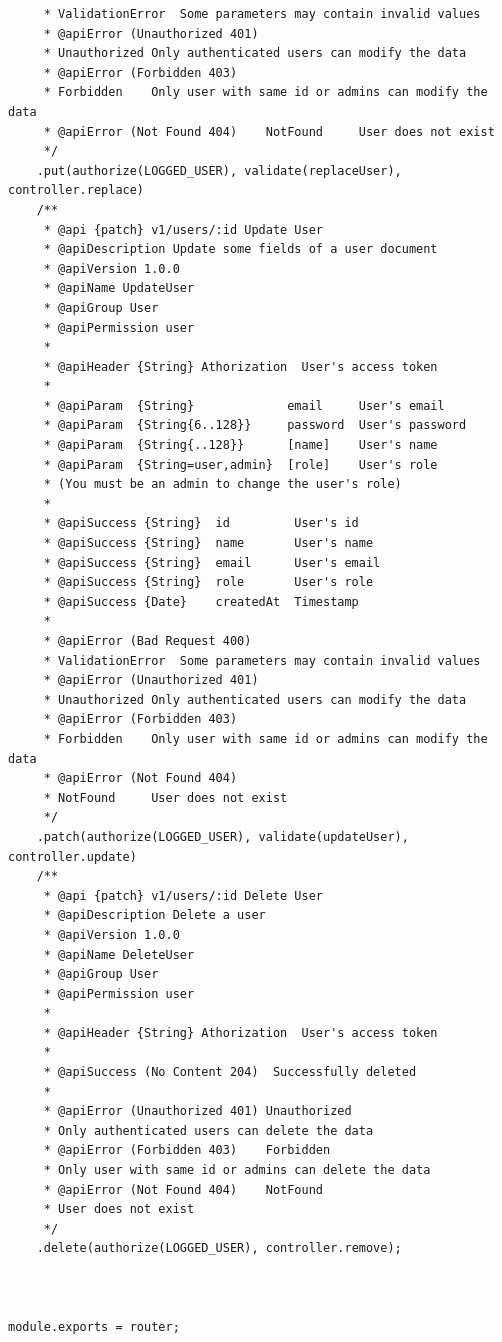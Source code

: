 \documentclass[12pt]{article}
\begin{document}
\begin{verbatim}
     * ValidationError  Some parameters may contain invalid values
     * @apiError (Unauthorized 401) 
     * Unauthorized Only authenticated users can modify the data
     * @apiError (Forbidden 403)    
     * Forbidden    Only user with same id or admins can modify the data
     * @apiError (Not Found 404)    NotFound     User does not exist
     */
    .put(authorize(LOGGED_USER), validate(replaceUser), controller.replace)
    /**
     * @api {patch} v1/users/:id Update User
     * @apiDescription Update some fields of a user document
     * @apiVersion 1.0.0
     * @apiName UpdateUser
     * @apiGroup User
     * @apiPermission user
     *
     * @apiHeader {String} Athorization  User's access token
     *
     * @apiParam  {String}             email     User's email
     * @apiParam  {String{6..128}}     password  User's password
     * @apiParam  {String{..128}}      [name]    User's name
     * @apiParam  {String=user,admin}  [role]    User's role
     * (You must be an admin to change the user's role)
     *
     * @apiSuccess {String}  id         User's id
     * @apiSuccess {String}  name       User's name
     * @apiSuccess {String}  email      User's email
     * @apiSuccess {String}  role       User's role
     * @apiSuccess {Date}    createdAt  Timestamp
     *
     * @apiError (Bad Request 400)  
     * ValidationError  Some parameters may contain invalid values
     * @apiError (Unauthorized 401) 
     * Unauthorized Only authenticated users can modify the data
     * @apiError (Forbidden 403)    
     * Forbidden    Only user with same id or admins can modify the data
     * @apiError (Not Found 404)    
     * NotFound     User does not exist
     */
    .patch(authorize(LOGGED_USER), validate(updateUser), controller.update)
    /**
     * @api {patch} v1/users/:id Delete User
     * @apiDescription Delete a user
     * @apiVersion 1.0.0
     * @apiName DeleteUser
     * @apiGroup User
     * @apiPermission user
     *
     * @apiHeader {String} Athorization  User's access token
     *
     * @apiSuccess (No Content 204)  Successfully deleted
     *
     * @apiError (Unauthorized 401) Unauthorized  
     * Only authenticated users can delete the data
     * @apiError (Forbidden 403)    Forbidden     
     * Only user with same id or admins can delete the data
     * @apiError (Not Found 404)    NotFound      
     * User does not exist
     */
    .delete(authorize(LOGGED_USER), controller.remove);



module.exports = router;

 \end{verbatim}
 
\end{document}
